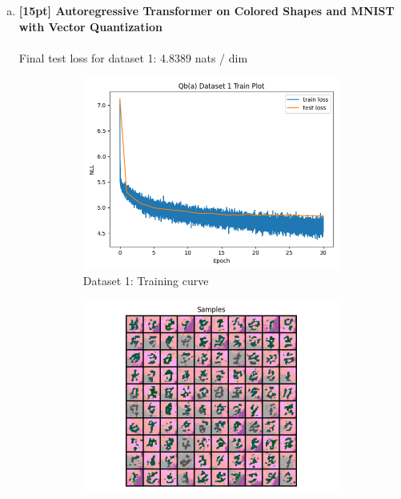 \documentclass{article}
\begin{document}
\begin{enumerate}[(a)]
\begin{figure}[H]
\begin{subfigure}{0.45\textwidth}
        \caption{Dataset 2: Quantized Examples}
    \end{subfigure} \\
\end{figure}

\item {\bf [15pt] Autoregressive Transformer on Colored Shapes and MNIST with Vector Quantization} \\\\
Final test loss for dataset 1: 4.8389 nats / dim
\begin{figure}[H]
    \centering
    \begin{subfigure}{0.45\textwidth}
        \centering
        \includegraphics[width=\textwidth]{figures/q4_b_dset1_train_plot.png}
        \caption{Dataset 1: Training curve}
    \end{subfigure}
    \hspace{0.2in}
    \begin{subfigure}{0.45\textwidth}
        \centering
        \includegraphics[width=\textwidth]{figures/q4_b_dset1_samples.png}

\end{subfigure}
\end{figure}
\end{enumerate}
\end{document}
